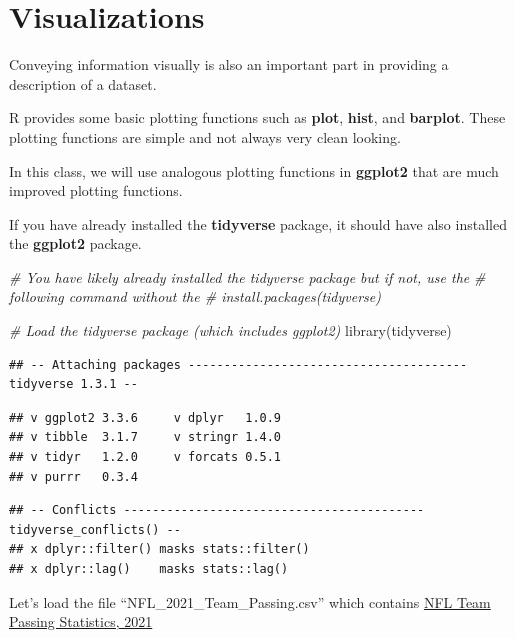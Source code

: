 \documentclass[
  11pt,
]{book}
\newenvironment{Shaded}{\begin{snugshade}}{\end{snugshade}}
\newcommand{\CommentTok}[1]{\textcolor[rgb]{0.56,0.35,0.01}{\textit{#1}}}
\newcommand{\FunctionTok}[1]{\textcolor[rgb]{0.00,0.00,0.00}{#1}}
\newcommand{\NormalTok}[1]{#1}
\theoremstyle{definition}
\theoremstyle{definition}
\theoremstyle{definition}
\theoremstyle{definition}
\theoremstyle{remark}
\begin{document}
\hypertarget{visualizations}{%
\section{Visualizations}\label{visualizations}}

Conveying information visually is also an important part in providing a description of a dataset.

R provides some basic plotting functions such as \textbf{plot}, \textbf{hist}, and \textbf{barplot}. These plotting functions are simple and not always very clean looking.

In this class, we will use analogous plotting functions in \textbf{ggplot2} that are much improved plotting functions.

If you have already installed the \textbf{tidyverse} package, it should have also installed the \textbf{ggplot2} package.

\begin{Shaded}
\begin{Highlighting}[]
\CommentTok{\# You have likely already installed the tidyverse package but if not, use the}
\CommentTok{\# following command without the \textquotesingle{}\#\textquotesingle{} install.packages(\textquotesingle{}tidyverse\textquotesingle{})}

\CommentTok{\# Load the tidyverse package (which includes ggplot2)}
\FunctionTok{library}\NormalTok{(tidyverse)}
\end{Highlighting}
\end{Shaded}

\begin{verbatim}
## -- Attaching packages --------------------------------------- tidyverse 1.3.1 --
\end{verbatim}

\begin{verbatim}
## v ggplot2 3.3.6     v dplyr   1.0.9
## v tibble  3.1.7     v stringr 1.4.0
## v tidyr   1.2.0     v forcats 0.5.1
## v purrr   0.3.4
\end{verbatim}

\begin{verbatim}
## -- Conflicts ------------------------------------------ tidyverse_conflicts() --
## x dplyr::filter() masks stats::filter()
## x dplyr::lag()    masks stats::lag()
\end{verbatim}

Let's load the file ``NFL\_2021\_Team\_Passing.csv'' which contains \href{https://www.pro-football-reference.com/years/2021/index.htm\#passing}{NFL Team Passing Statistics, 2021}
\end{document}
